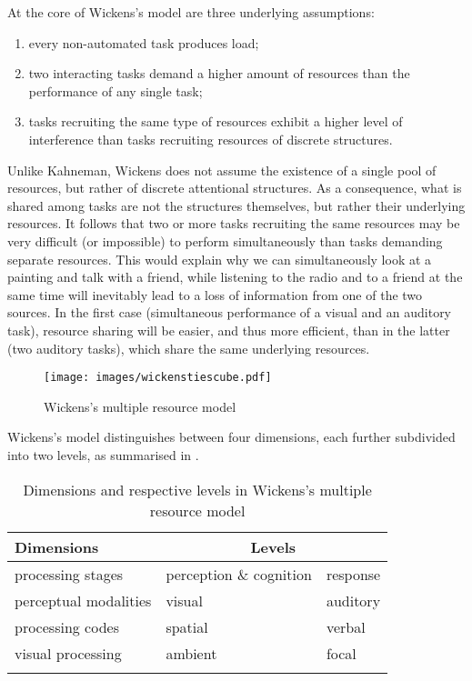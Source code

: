 At the core of Wickens's model are three underlying assumptions:

\begin{enumerate}
\item every non-automated task produces load;
\item two interacting tasks demand a higher amount of resources than the performance of any single task;
\item tasks recruiting the same type of resources exhibit a higher level of interference than tasks recruiting resources of discrete structures.
\end{enumerate}
Unlike Kahneman, Wickens does not assume the existence of a single pool of resources, but rather of discrete attentional structures. As a consequence, what is shared among tasks are not the structures themselves, but rather their underlying resources. It follows that two or more tasks recruiting the same resources may be very difficult (or impossible) to perform simultaneously than tasks demanding separate resources. This would explain why we can simultaneously look at a painting and talk with a friend, while listening to the radio and to a friend at the same time will inevitably lead to a loss of information from one of the two sources. In the first case (simultaneous performance of a visual and an auditory task), resource sharing will be easier, and thus more efficient, than in the latter (two auditory tasks), which share the same underlying resources.

\begin{figure}
\texttt{[image: images/wickenstiescube.pdf]}
\caption[Wickens's Cognitive Load Model]{Wickens's multiple resource model \protect\citep[163]{wickens_multiple_2002}}
\label{fig:wickensm}
\end{figure}

Wickens's model distinguishes between four dimensions, each further subdivided into two levels, as summarised in .

\begin{table}
\begin{tabular}{lll}
    \lsptoprule
    Dimensions &  \multicolumn{2}{c}{Levels}\\\midrule
    processing stages & perception \& cognition & response\\
    perceptual modalities & visual & auditory\\
    processing codes & spatial & verbal\\
    visual processing & ambient & focal\\
    \lspbottomrule
\end{tabular}
\caption{Dimensions and respective levels in Wickens's multiple resource model\label{tab:wickens}}
\end{table}

